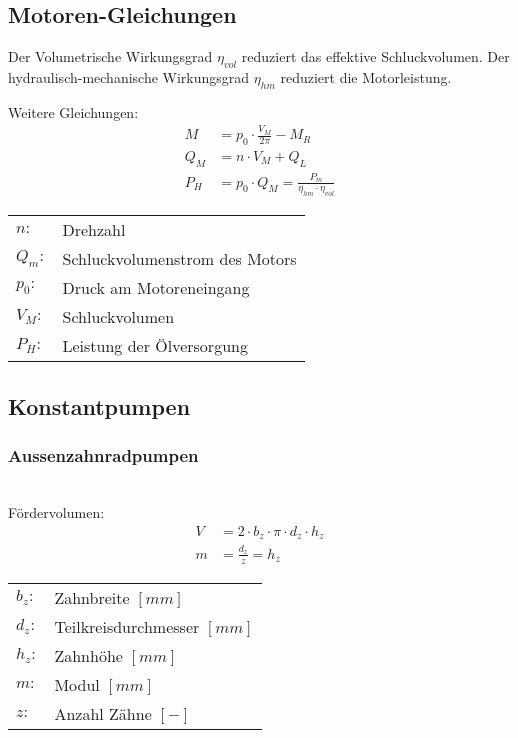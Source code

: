 \subsection{Motoren-Gleichungen}
Der Volumetrische Wirkungsgrad $\eta_{vol}$ reduziert das effektive Schluckvolumen. Der hydraulisch-mechanische Wirkungsgrad $\eta_{hm}$ reduziert die Motorleistung. 


Weitere Gleichungen:
\begin{align*}
M &= p_0 \cdot \frac{V_M}{2 \pi} - M_R \tag{Lastmoment} \\
Q_M &= n \cdot V_M + Q_L \tag{Volumenstrom} \\
P_H &= p_0 \cdot Q_M = \frac{P_m}{\eta_{hm} \cdot \eta_{vol}}
\end{align*}

\begin{tabular}{ll}
$n:$ & Drehzahl \\
$Q_m:$ & Schluckvolumenstrom des Motors\\
$p_0:$ & Druck am Motoreneingang \\
$V_M:$ & Schluckvolumen \\
$P_H:$ & Leistung der Ölversorgung \\
\end{tabular}



\subsection{Konstantpumpen}


\subsubsection{Aussenzahnradpumpen}
\\
Fördervolumen: \\
\begin{align*}
V &= 2 \cdot b_z \cdot \pi \cdot d_z \cdot h_z \\
m &= \frac{d_z}{z} = h_z
\end{align*}


\begin{tabular}{ll}
$b_z:$ & Zahnbreite $[mm]$\\
$d_z:$& Teilkreisdurchmesser $[mm]$\\
$h_z:$& Zahnhöhe $[mm]$\\
$m:$& Modul $[mm]$\\
$z:$& Anzahl Zähne $[-]$
\end{tabular} \\


